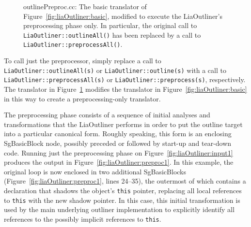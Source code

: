 \begin{figure}[!h]
{\indent
{\mySmallFontSize
\begin{latexonly}
   
\end{latexonly}
\begin{htmlonly}
   
\end{htmlonly}

}
}
\caption{outlinePreproc.cc: The basic translator of
Figure~\ref{fig:liaOutliner:basic}, modified to execute the
LiaOutliner's preprocessing phase only.  In particular, the original
call to \texttt{LiaOutliner::outlineAll()} has been replaced by a call
to \texttt{LiaOutliner::preprocessAll()}.}
\label{fig:liaOutliner:preproc}
\end{figure}

To call just the preprocessor, simply replace a call to
\texttt{LiaOutliner::outlineAll(s)} or
\texttt{LiaOutliner::outline(s)} with a call to
\texttt{LiaOutliner::preprocessAll(s)} or
\texttt{LiaOutliner::preprocess(s)}, respectively. The translator in
Figure~\ref{fig:liaOutliner:preproc} modifies the translator in
Figure~\ref{fig:liaOutliner:basic} in this way to create a
preprocessing-only translator.

The preprocessing phase consists of a sequence of initial analyses and
transformations that the LiaOutliner performs in order to put the
outline target into a particular canonical form. Roughly speaking,
this form is an enclosing SgBasicBlock node, possibly preceded or
followed by start-up and tear-down code. Running just the
preprocessing phase on Figure~\ref{fig:liaOutliner:input1} produces
the output in Figure~\ref{fig:liaOutliner:preproc1}. In this example,
the original loop is now enclosed in two additional SgBasicBlocks
(Figure~\ref{fig:liaOutliner:preproc1}, lines 24--35), the outermost
of which contains a declaration that shadows the object's
\texttt{this} pointer, replacing all local references to \texttt{this}
with the new shadow pointer. In this case, this initial transformation
is used by the main underlying outliner implementation to explicitly
identify all references to the possibly implicit references to
\texttt{this}.

